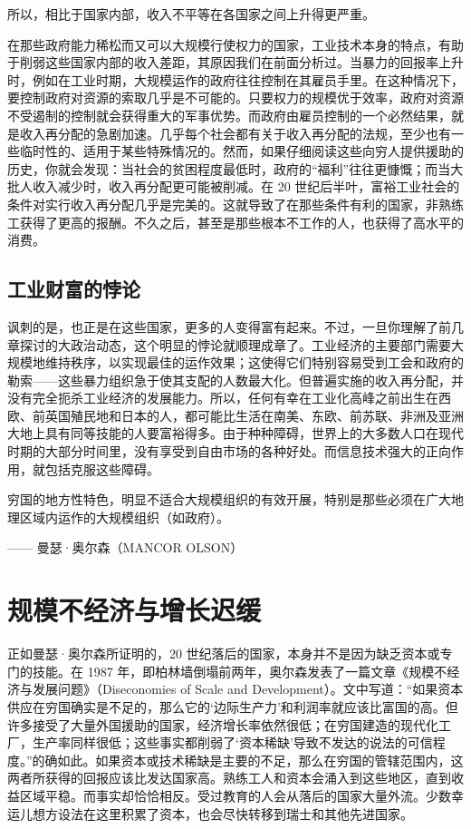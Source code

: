 所以，相比于国家内部，收入不平等在各国家之间上升得更严重。

在那些政府能力稀松而又可以大规模行使权力的国家，工业技术本身的特点，有助于削弱这些国家内部的收入差距，其原因我们在前面分析过。当暴力的回报率上升时，例如在工业时期，大规模运作的政府往往控制在其雇员手里。在这种情况下，要控制政府对资源的索取几乎是不可能的。只要权力的规模优于效率，政府对资源不受遏制的控制就会获得重大的军事优势。而政府由雇员控制的一个必然结果，就是收入再分配的急剧加速。几乎每个社会都有关于收入再分配的法规，至少也有一些临时性的、适用于某些特殊情况的。然而，如果仔细阅读这些向穷人提供援助的历史，你就会发现：当社会的贫困程度最低时，政府的“福利”往往更慷慨；而当大批人收入减少时，收入再分配更可能被削减。在 20 世纪后半叶，富裕工业社会的条件对实行收入再分配几乎是完美的。这就导致了在那些条件有利的国家，非熟练工获得了更高的报酬。不久之后，甚至是那些根本不工作的人，也获得了高水平的消费。

\subsection{工业财富的悖论}

讽刺的是，也正是在这些国家，更多的人变得富有起来。不过，一旦你理解了前几章探讨的大政治动态，这个明显的悖论就顺理成章了。工业经济的主要部门需要大规模地维持秩序，以实现最佳的运作效果；这使得它们特别容易受到工会和政府的勒索——这些暴力组织急于使其支配的人数最大化。但普遍实施的收入再分配，并没有完全扼杀工业经济的发展能力。所以，任何有幸在工业化高峰之前出生在西欧、前英国殖民地和日本的人，都可能比生活在南美、东欧、前苏联、非洲及亚洲大地上具有同等技能的人要富裕得多。由于种种障碍，世界上的大多数人口在现代时期的大部分时间里，没有享受到自由市场的各种好处。而信息技术强大的正向作用，就包括克服这些障碍。


\begin{tcolorbox}
\kaishu 穷国的地方性特色，明显不适合大规模组织的有效开展，特别是那些必须在广大地理区域内运作的大规模组织（如政府）。
\begin{flushright}
—— 曼瑟·奥尔森（MANCOR OLSON）  
\end{flushright}
\end{tcolorbox}

\section{规模不经济与增长迟缓}
正如曼瑟·奥尔森所证明的，20 世纪落后的国家，本身并不是因为缺乏资本或专门的技能。在 1987 年，即柏林墙倒塌前两年，奥尔森发表了一篇文章《规模不经济与发展问题》（Diseconomies of Scale and Development）。文中写道：“如果资本供应在穷国确实是不足的，那么它的‘边际生产力’和利润率就应该比富国的高。但许多接受了大量外国援助的国家，经济增长率依然很低；在穷国建造的现代化工厂，生产率同样很低；这些事实都削弱了‘资本稀缺’导致不发达的说法的可信程度。”的确如此。如果资本或技术稀缺是主要的不足，那么在穷国的管辖范围内，这两者所获得的回报应该比发达国家高。熟练工人和资本会涌入到这些地区，直到收益区域平稳。而事实却恰恰相反。受过教育的人会从落后的国家大量外流。少数幸运儿想方设法在这里积累了资本，也会尽快转移到瑞士和其他先进国家。

